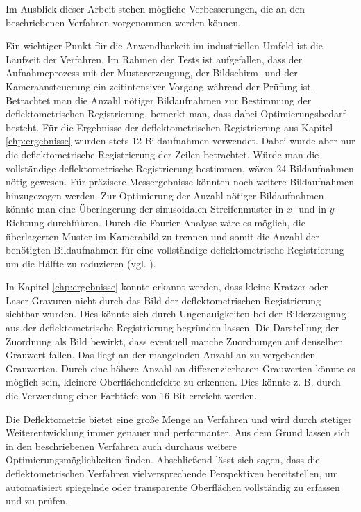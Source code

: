 Im Ausblick dieser Arbeit stehen mögliche Verbesserungen, die an den beschriebenen Verfahren vorgenommen werden können.

\p
Ein wichtiger Punkt für die Anwendbarkeit im industriellen Umfeld ist die Laufzeit der Verfahren.
Im Rahmen der Tests ist aufgefallen, dass der Aufnahmeprozess mit der Mustererzeugung, der Bildschirm- und der Kameraansteuerung ein zeitintensiver Vorgang während der Prüfung ist.
Betrachtet man die Anzahl nötiger Bildaufnahmen zur Bestimmung der deflektometrischen Registrierung, bemerkt man, dass dabei Optimierungsbedarf besteht.
Für die Ergebnisse der deflektometrischen Registrierung aus Kapitel \ref{chp:ergebnisse} wurden stets 12 Bildaufnahmen verwendet.
Dabei wurde aber nur die deflektometrische Registrierung der Zeilen betrachtet.
Würde man die vollständige deflektometrische Registrierung bestimmen, wären 24 Bildaufnahmen nötig gewesen.
Für präzisere Messergebnisse könnten noch weitere Bildaufnahmen hinzugezogen werden.
Zur Optimierung der Anzahl nötiger Bildaufnahmen könnte man eine Überlagerung der sinusoidalen Streifenmuster in $x$- und in $y$-Richtung durchführen.
Durch die Fourier-Analyse wäre es möglich, die überlagerten Muster im Kamerabild zu trennen und somit die Anzahl der benötigten Bildaufnahmen für eine vollständige deflektometrische Registrierung um die Hälfte zu reduzieren (vgl. \cite{singleShotPMD}).

\p
In Kapitel \ref{chp:ergebnisse} konnte erkannt werden, dass kleine Kratzer oder Laser-Gravuren nicht durch das Bild der deflektometrischen Registrierung sichtbar wurden.
Dies könnte sich durch Ungenauigkeiten bei der Bilderzeugung aus der deflektometrische Registrierung begründen lassen.
Die Darstellung der Zuordnung als Bild bewirkt, dass eventuell manche Zuordnungen auf denselben Grauwert fallen.
Das liegt an der mangelnden Anzahl an zu vergebenden Grauwerten.
Durch eine höhere Anzahl an differenzierbaren Grauwerten könnte es möglich sein, kleinere Oberflächendefekte zu erkennen.
Dies könnte z. B. durch die Verwendung einer Farbtiefe von 16-Bit erreicht werden.

\p
Die Deflektometrie bietet eine große Menge an Verfahren und wird durch stetiger Weiterentwicklung immer genauer und performanter.
Aus dem Grund lassen sich in den beschriebenen Verfahren auch durchaus weitere Optimierungsmöglichkeiten finden.
Abschließend lässt sich sagen, dass die deflektometrischen Verfahren vielversprechende Perspektiven bereitstellen, um automatisiert spiegelnde oder transparente Oberflächen vollständig zu erfassen und zu prüfen.